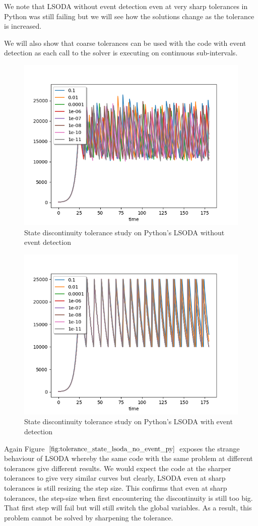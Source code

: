 We note that LSODA without event detection even at very sharp tolerances in Python was still failing but we will see how the solutions change as the tolerance is increased. 

We will also show that coarse tolerances can be used with the code with event detection as each call to the solver is executing on continuous sub-intervals.   

\begin{figure}[h]
	\centering
	\includegraphics[width=0.7\linewidth]{./figures/tolerance_state_lsoda_no_event_py}
	\caption{State discontinuity tolerance study on Python's LSODA without event detection}
	\label{fig:tolerance_state_lsoda_no_event_py}
\end{figure}

\begin{figure}[h]
	\centering
	\includegraphics[width=0.7\linewidth]{./figures/tolerance_state_lsoda_with_event_py}
	\caption{State discontinuity tolerance study on Python's LSODA with event detection}
	\label{fig:tolerance_state_lsoda_with_event_py}
\end{figure}

Again Figure $\ref{fig:tolerance_state_lsoda_no_event_py}$ exposes the strange behaviour of LSODA whereby the same code with the same problem at different tolerances give different results. We would expect the code at the sharper tolerances to give very similar curves but clearly, LSODA even at sharp tolerances is still resizing the step size. This confirms that even at sharp tolerances, the step-size when first encountering the discontinuity is still too big. That first step will fail but will still switch the global variables. As a result, this problem cannot be solved by sharpening the tolerance.

